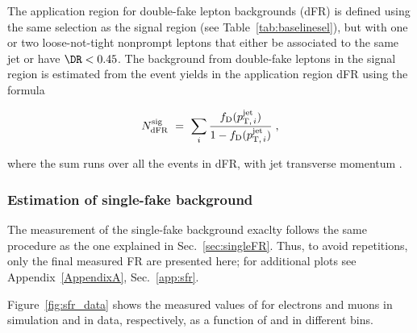 The application region for double-fake lepton backgrounds (dFR)
is defined using the same selection as the signal region (see
Table~\ref{tab:baselinesel}), but with one or two loose-not-tight
nonprompt leptons that either be associated to the same jet or have $\DR<0.45$. 
The background from double-fake leptons in the signal region is
estimated from the event yields in the application region dFR using
the formula
\begin{linenomath}
  \begin{equation}
    \label{eq:dFRbkg}
    N_{\mathrm{dFR}}^{\mathrm{sig}} ~=~ 
    \sum_i\frac{f_{\mathrm{D}}(p_{\mathrm{T,\,}i}^{\mathrm{jet}})}{1-f_{\mathrm{D}}(p_{\mathrm{T,\,}i}^{\mathrm{jet}})}\;,
  \end{equation}
\end{linenomath}
where the sum runs over all the events in dFR, with jet transverse momentum .

\subsubsection{Estimation of single-fake background}
\label{sec:singleFakeBkg}

The measurement of the single-fake background exaclty follows the same
procedure as the one explained in Sec.~\ref{sec:singleFR}. Thus, to
avoid repetitions, only the final measured FR are presented here; for
additional plots see Appendix~\ref{AppendixA}, Sec.~\ref{app:sfr}.

Figure~\ref{fig:sfr_data} shows the measured
values of \sfr for electrons and muons in simulation and in data,
respectively, as a function of \ptc and in different \abseta bins.


